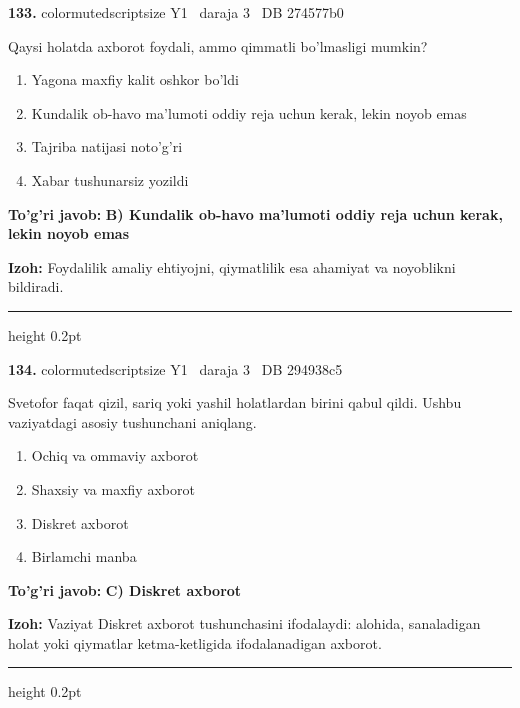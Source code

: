 \documentclass[10pt,a4paper,oneside]{article}
\begin{document}
\noindent\textbf{\color{ink}133.}  {color{muted}scriptsize Y1 \textbullet\ daraja 3 \textbullet\ DB 274577b0}
\par
Qaysi holatda axborot foydali, ammo qimmatli bo'lmasligi mumkin?
\begin{enumerate}[label=\Alph*),leftmargin=9mm]
\item Yagona maxfiy kalit oshkor bo'ldi
\item Kundalik ob-havo ma'lumoti oddiy reja uchun kerak, lekin noyob emas
\item Tajriba natijasi noto'g'ri
\item Xabar tushunarsiz yozildi
\end{enumerate}
\begin{tcolorbox}[enhanced,breakable,colback=teal!4,colframe=teal!50!black,boxrule=0.5pt,arc=1.1mm,left=3mm,right=3mm,top=1.7mm,bottom=1.7mm,before skip=2mm,after skip=2mm]
\textbf{\color{teal}To'g'ri javob:} \textbf{B) Kundalik ob-havo ma'lumoti oddiy reja uchun kerak, lekin noyob emas}
\par\smallskip
\textbf{Izoh:} Foydalilik amaliy ehtiyojni, qiymatlilik esa ahamiyat va noyoblikni bildiradi.
\end{tcolorbox}
\vspace{2mm}\hrule height 0.2pt \vspace{3mm}

\noindent\textbf{\color{ink}134.}  {color{muted}scriptsize Y1 \textbullet\ daraja 3 \textbullet\ DB 294938c5}
\par
Svetofor faqat qizil, sariq yoki yashil holatlardan birini qabul qildi. Ushbu vaziyatdagi asosiy tushunchani aniqlang.
\begin{enumerate}[label=\Alph*),leftmargin=9mm]
\item Ochiq va ommaviy axborot
\item Shaxsiy va maxfiy axborot
\item Diskret axborot
\item Birlamchi manba
\end{enumerate}
\begin{tcolorbox}[enhanced,breakable,colback=teal!4,colframe=teal!50!black,boxrule=0.5pt,arc=1.1mm,left=3mm,right=3mm,top=1.7mm,bottom=1.7mm,before skip=2mm,after skip=2mm]
\textbf{\color{teal}To'g'ri javob:} \textbf{C) Diskret axborot}
\par\smallskip
\textbf{Izoh:} Vaziyat Diskret axborot tushunchasini ifodalaydi: alohida, sanaladigan holat yoki qiymatlar ketma-ketligida ifodalanadigan axborot.
\end{tcolorbox}
\vspace{2mm}\hrule height 0.2pt \vspace{3mm}
\end{document}

